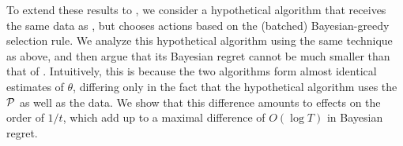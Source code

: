 To extend these results to \fg, we consider a hypothetical algorithm that receives the same data as \fg, but chooses actions based on the (batched) Bayesian-greedy selection rule. We analyze this hypothetical algorithm using the same technique as above, and then argue that its Bayesian regret cannot be much smaller than that of \fg. Intuitively, this is because the two algorithms form
almost identical estimates of $\theta$, differing only in the fact that the hypothetical algorithm uses the $\mathcal{P}$ as well as the data. We show that this difference amounts to effects on the order of $1/t$, which add up to a maximal difference of $O(\log T)$ in Bayesian regret.

